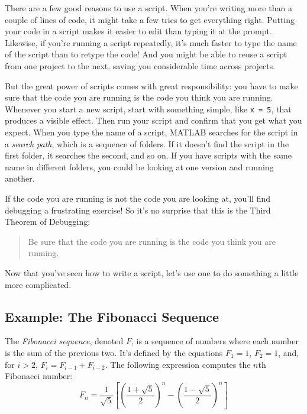 \documentclass[../../book.tex]{subfiles}
\begin{document}
There are a few good reasons to use a script. When you're writing more than a couple of lines of code, it might take a few tries to get everything right.  Putting your code
in a script makes it easier to edit than typing it at the prompt. Likewise, if you're running a script repeatedly, it's much faster to type the name of the script than to retype the code! And you might be able to reuse a script from one project to the next, saving you considerable time across projects.



But the great power of scripts comes with great responsibility: you have to make sure that the code you are running is the code you think you are running.
Whenever you start a new script, start with something simple, like \lstinline{x = 5}, that produces a visible effect. Then run your script and confirm that you get what you expect.
When you type the name of a script, MATLAB searches for the script in a \emph{search path}, which is a sequence of folders.  If it doesn't find the script in the first folder, it searches the second, and so on.
If you have scripts with the same name in different folders, you could be looking at one version and running another.



If the code you are running is not the code you are looking
at, you'll find debugging a frustrating exercise!  So it's no surprise that this is the Third Theorem of Debugging:

\begin{quote}
Be sure that the code you are running
is the code you think you are running.
\end{quote}

Now that you've seen how to write a script, let's use one to do something a little more complicated.

\subsection{Example: The Fibonacci Sequence}


The \emph{Fibonacci sequence}, denoted $F$, is a sequence of numbers where each number is the sum of the previous two.
It's defined by the equations $F_1 = 1$, $F_2 = 1$, and, for $i > 2$, $F_{i} = F_{i-1} + F_{i-2}$.
The following expression computes the $n$th Fibonacci number:
%
\begin{equation*}
F_n = \frac{1}{\sqrt{5}}
\left[
\left( \frac{1 + \sqrt{5}}{2} \right)^{n} -
\left( \frac{1 - \sqrt{5}}{2} \right)^{n}
\right]
\end{equation*}
%
\end{document}
